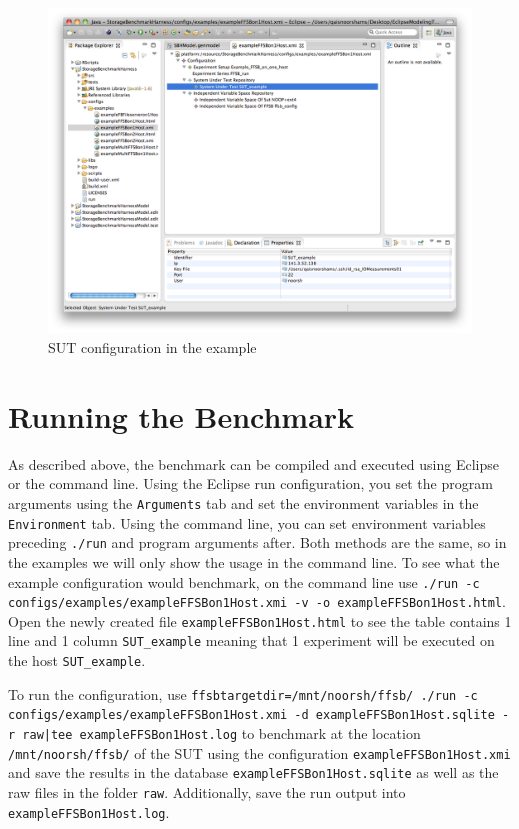 \begin{figure}[htbp]
	\centering
	\includegraphics[scale=0.375]{graphics/example/ConfigurationSUT.png}
	\caption{SUT configuration in the example}
 	\label{fig:ExampleConfigurationSUT}
\end{figure}

\section{Running the Benchmark}

As described above, the benchmark can be compiled and executed using Eclipse or the command line. 
Using the Eclipse run configuration, you set the program arguments using the \texttt{Arguments} tab and set the environment variables in the \texttt{Environment} tab. Using the command line, you can set environment variables preceding \texttt{./run} and program arguments after.  
Both methods are the same, so in the examples we will only show the usage in the command line. 
To see what the example configuration would benchmark, on the command line use \texttt{./run -c configs/examples/exampleFFSBon1Host.xmi -v -o exampleFFSBon1Host.html}. Open the newly created file \texttt{exampleFFSBon1Host.html} to see the table contains 1 line and 1 column \texttt{SUT\_example} meaning that 1 experiment will be executed on the host \texttt{SUT\_example}.

To run the configuration, use \texttt{ffsbtargetdir=/mnt/noorsh/ffsb/ ./run -c configs/{\allowbreak}examples/exampleFFSBon1Host.xmi -d exampleFFSBon1Host.sqlite -r raw|tee exampleFFSBon1Host.log} to benchmark at the location \texttt{/mnt/noorsh/ffsb/} of the SUT using the configuration \texttt{exampleFFSBon1Host.xmi} and save the results in the database \texttt{exampleFFSBon1Host.sqlite} as well as the raw files in the folder \texttt{raw}. Additionally, save the run output into \texttt{exampleFFSBon1Host.log}. 

